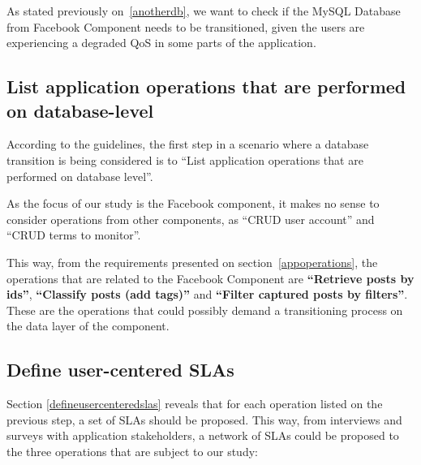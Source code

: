As stated previously on~\ref{anotherdb}, we want to check if the MySQL Database from Facebook Component needs to be transitioned, given the users are experiencing a degraded QoS in some parts of the application. 

\clearpage
\subsection{List application operations that are performed on database-level}
According to the guidelines, the first step in a scenario where a database transition is being considered is to ``List application operations that are performed on database level''. 

As the focus of our study is the Facebook component, it makes no sense to consider operations from other components, as ``CRUD user account'' and ``CRUD terms to monitor''. 

This way, from the requirements presented on section~\ref{appoperations}, the operations that are related to the Facebook Component are \textbf{``Retrieve posts by ids''}, \textbf{``Classify posts (add tags)''} and \textbf{``Filter captured posts by filters''}. These are the operations that could possibly demand a transitioning process on the data layer of the component.  

\clearpage
\subsection{Define user-centered SLAs}

Section \ref{defineusercenteredslas} reveals that for each operation listed on the previous step, a set of SLAs should be proposed. This way, from interviews and surveys with application stakeholders, a network of SLAs could be proposed to the three operations that are subject to our study: 

